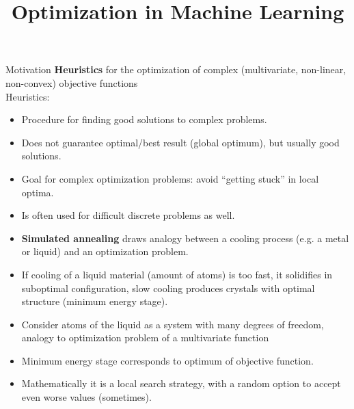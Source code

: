 \documentclass[11pt,compress,t,notes=noshow, xcolor=table]{beamer}
\title{Optimization in Machine Learning}
\date{}
\begin{document}
\sloppy

\begin{vbframe}{Motivation}
\textbf{Heuristics} for the optimization of complex (multivariate, non-linear, non-convex) objective functions \\
\lz
Heuristics:
\begin{itemize}
\item Procedure for finding good solutions to complex problems.
\item Does not guarantee optimal/best result (global optimum), but usually good solutions.
\item Goal for complex optimization problems: avoid \enquote{getting stuck} in local optima.
\item Is often used for difficult discrete problems as well.
\end{itemize}

\framebreak

\begin{itemize}
\item \textbf{Simulated annealing} draws analogy between a cooling process (e.g. a metal or liquid) and an optimization problem.
\item If cooling of a liquid material (amount of atoms) is too fast, it solidifies in suboptimal configuration, slow cooling produces crystals with optimal structure (minimum energy stage).
\item Consider atoms of the liquid as a system with many degrees of freedom, analogy to optimization problem of a multivariate function
\item Minimum energy stage corresponds to optimum of objective function.
\item Mathematically it is a local search strategy, with a random option to accept even worse values (sometimes).

\end{itemize}
\end{vbframe}
\end{document}
